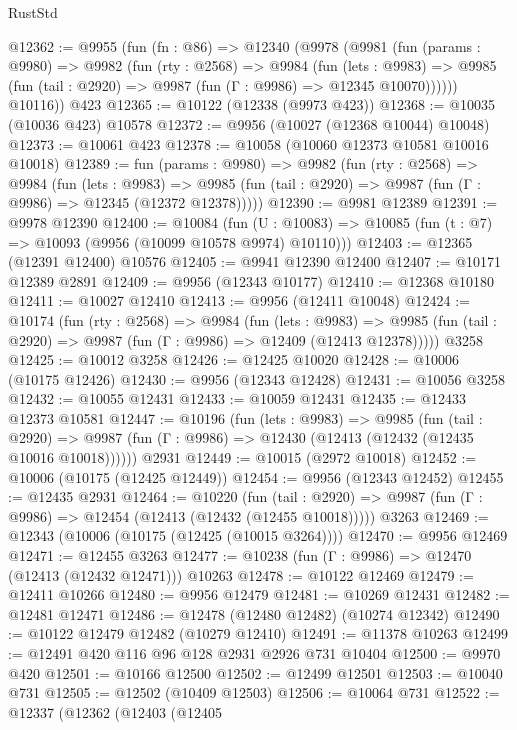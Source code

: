 \begin{lexlean}{RustStd}
\begin{coremodule}
@12362 := @9955
    (fun (fn : @86) =>
    @12340
      (@9978
        (@9981
          (fun (params : @9980) =>
          @9982
            (fun (rty : @2568) =>
            @9984
              (fun (lets : @9983) =>
              @9985 (fun (tail : @2920) => @9987 (fun (Γ : @9986) => @12345 @10070))))))
        @10116))
    @423
@12365 := @10122 (@12338 (@9973 @423))
@12368 := @10035 (@10036 @423) @10578
@12372 := @9956 (@10027 (@12368 @10044) @10048)
@12373 := @10061 @423
@12378 := @10058 (@10060 @12373 @10581 @10016 @10018)
@12389 := fun (params : @9980) =>
  @9982
    (fun (rty : @2568) =>
    @9984
      (fun (lets : @9983) =>
      @9985 (fun (tail : @2920) => @9987 (fun (Γ : @9986) => @12345 (@12372 @12378)))))
@12390 := @9981 @12389
@12391 := @9978 @12390
@12400 := @10084
    (fun (U : @10083) => @10085 (fun (t : @7) => @10093 (@9956 (@10099 @10578 @9974) @10110)))
@12403 := @12365 (@12391 @12400) @10576
@12405 := @9941 @12390 @12400
@12407 := @10171 @12389 @2891
@12409 := @9956 (@12343 @10177)
@12410 := @12368 @10180
@12411 := @10027 @12410
@12413 := @9956 (@12411 @10048)
@12424 := @10174
    (fun (rty : @2568) =>
    @9984
      (fun (lets : @9983) =>
      @9985 (fun (tail : @2920) => @9987 (fun (Γ : @9986) => @12409 (@12413 @12378)))))
    @3258
@12425 := @10012 @3258
@12426 := @12425 @10020
@12428 := @10006 (@10175 @12426)
@12430 := @9956 (@12343 @12428)
@12431 := @10056 @3258
@12432 := @10055 @12431
@12433 := @10059 @12431
@12435 := @12433 @12373 @10581
@12447 := @10196
    (fun (lets : @9983) =>
    @9985
      (fun (tail : @2920) =>
      @9987 (fun (Γ : @9986) => @12430 (@12413 (@12432 (@12435 @10016 @10018))))))
    @2931
@12449 := @10015 (@2972 @10018)
@12452 := @10006 (@10175 (@12425 @12449))
@12454 := @9956 (@12343 @12452)
@12455 := @12435 @2931
@12464 := @10220
    (fun (tail : @2920) => @9987 (fun (Γ : @9986) => @12454 (@12413 (@12432 (@12455 @10018)))))
    @3263
@12469 := @12343 (@10006 (@10175 (@12425 (@10015 @3264))))
@12470 := @9956 @12469
@12471 := @12455 @3263
@12477 := @10238 (fun (Γ : @9986) => @12470 (@12413 (@12432 @12471))) @10263
@12478 := @10122 @12469
@12479 := @12411 @10266
@12480 := @9956 @12479
@12481 := @10269 @12431
@12482 := @12481 @12471
@12486 := @12478 (@12480 @12482) (@10274 @12342)
@12490 := @10122 @12479 @12482 (@10279 @12410)
@12491 := @11378 @10263
@12499 := @12491 @420 @116 @96 @128 @2931 @2926 @731 @10404
@12500 := @9970 @420
@12501 := @10166 @12500
@12502 := @12499 @12501
@12503 := @10040 @731
@12505 := @12502 (@10409 @12503)
@12506 := @10064 @731
@12522 := @12337
    (@12362
      (@12403
        (@12405

\end{coremodule}
\end{lexlean}
